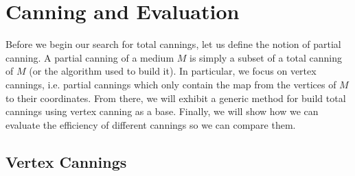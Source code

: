 \documentclass{report}
\begin{document}
\section{Canning and Evaluation}

Before we begin our search for total cannings, let us define the notion of partial canning. A partial canning of a medium $M$ is simply a subset of a total canning of $M$ (or the algorithm used to build it). In particular, we focus on vertex cannings, i.e. partial cannings which only contain the map from the vertices of $M$ to their coordinates. From there, we will exhibit a generic method for build total cannings using vertex canning as a base. Finally, we will show how we can evaluate the efficiency of different cannings so we can compare them.

\subsection{Vertex Cannings}
\label{partial_canning}
\end{document}
